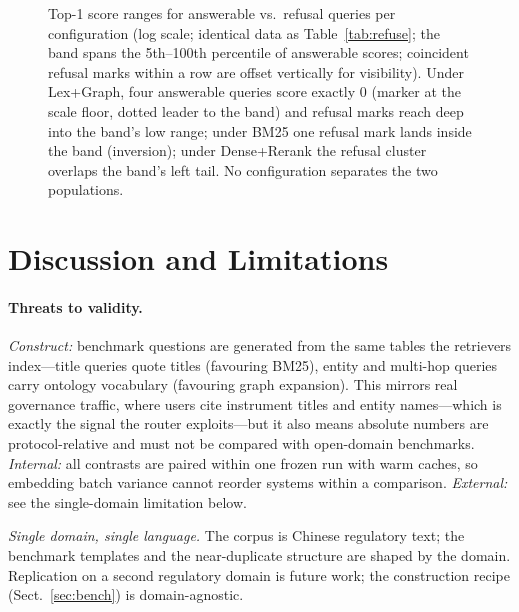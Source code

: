 \documentclass[runningheads]{llncs}
\begin{document}
\begin{figure}[t]
\caption{Top-1 score ranges for answerable vs.\ refusal queries per
configuration (log scale; identical data as Table~\ref{tab:refuse}; the
band spans the 5th--100th percentile of answerable scores; coincident
refusal marks within a row are offset vertically for visibility). Under
Lex+Graph, four answerable queries score exactly 0 (marker at the scale
floor, dotted leader to the band) and refusal marks reach deep into the
band's low range; under BM25 one refusal mark lands inside the band
(inversion); under Dense+Rerank the refusal cluster overlaps the band's
left tail. No configuration separates the two populations.}
\label{fig:refuse}
\end{figure}

\section{Discussion and Limitations}
\label{sec:limits}

\paragraph{Threats to validity.}
\emph{Construct:} benchmark questions are generated from the same tables the
retrievers index---title queries quote titles (favouring BM25), entity and
multi-hop queries carry ontology vocabulary (favouring graph expansion).
This mirrors real governance traffic, where users cite instrument titles
and entity names---which is exactly the signal the router exploits---but it
also means absolute numbers are protocol-relative and must not be compared
with open-domain benchmarks. \emph{Internal:} all contrasts are paired
within one frozen run with warm caches, so embedding batch variance cannot
reorder systems within a comparison. \emph{External:} see the single-domain
limitation below.

\emph{Single domain, single language.} The corpus is Chinese regulatory
text; the benchmark templates and the near-duplicate structure are shaped
by the domain. Replication on a second regulatory domain is future work;
the construction recipe (Sect.~\ref{sec:bench}) is domain-agnostic.
\end{document}
